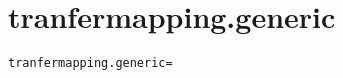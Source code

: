 \section{tranfermapping.generic}
\label{configuration:TranfermappingGeneric}
\AvailableInCsharpOnly{\TODO}
\begin{lstlisting}[style=Props,caption={Usage example for \textit{tranfermapping.generic}}]
tranfermapping.generic=
\end{lstlisting}